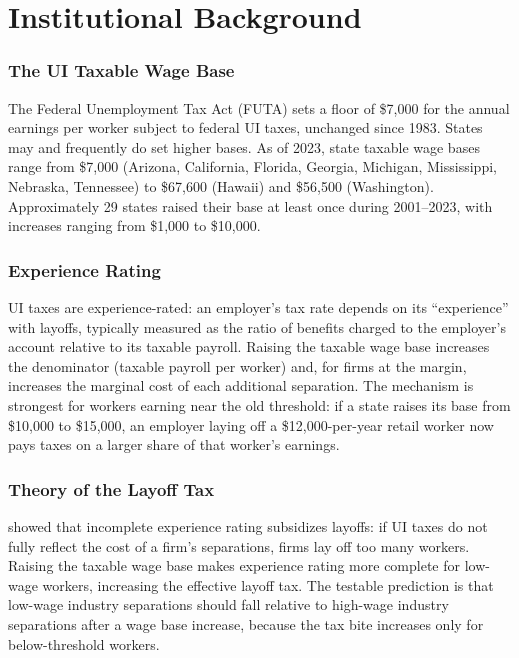 \documentclass[12pt]{article}
\begin{document}
\section{Institutional Background}

\subsubsection*{The UI Taxable Wage Base}
The Federal Unemployment Tax Act (FUTA) sets a floor of \$7,000 for the annual earnings per worker subject to federal UI taxes, unchanged since 1983. States may and frequently do set higher bases. As of 2023, state taxable wage bases range from \$7,000 (Arizona, California, Florida, Georgia, Michigan, Mississippi, Nebraska, Tennessee) to \$67,600 (Hawaii) and \$56,500 (Washington). Approximately 29 states raised their base at least once during 2001--2023, with increases ranging from \$1,000 to \$10,000.

\subsubsection*{Experience Rating}
UI taxes are experience-rated: an employer's tax rate depends on its ``experience'' with layoffs, typically measured as the ratio of benefits charged to the employer's account relative to its taxable payroll. Raising the taxable wage base increases the denominator (taxable payroll per worker) and, for firms at the margin, increases the marginal cost of each additional separation. The mechanism is strongest for workers earning near the old threshold: if a state raises its base from \$10,000 to \$15,000, an employer laying off a \$12,000-per-year retail worker now pays taxes on a larger share of that worker's earnings.

\subsubsection*{Theory of the Layoff Tax}
\citet{feldstein1976} showed that incomplete experience rating subsidizes layoffs: if UI taxes do not fully reflect the cost of a firm's separations, firms lay off too many workers. Raising the taxable wage base makes experience rating more complete for low-wage workers, increasing the effective layoff tax. The testable prediction is that low-wage industry separations should fall relative to high-wage industry separations after a wage base increase, because the tax bite increases only for below-threshold workers.
\end{document}
